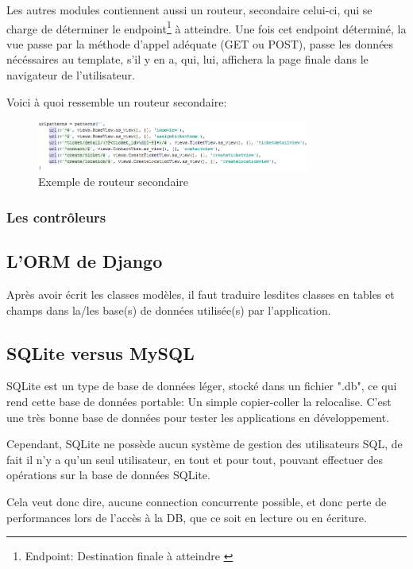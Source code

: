 \documentclass[12pt,table,a4paper]{report}
\begin{document}
Les autres modules contiennent aussi un routeur, secondaire celui-ci, qui se charge de déterminer le endpoint\footnote{Endpoint: Destination finale à atteindre \label{endpointFootnote}} à atteindre. Une fois cet endpoint déterminé, la vue passe par la méthode d'appel adéquate (GET ou POST), passe les données nécéssaires au template, s'il y en a, qui, lui, affichera la page finale dans le navigateur de l'utilisateur.

Voici à quoi ressemble un routeur secondaire:
\begin{figure}
	\centering
		\includegraphics[width=0.8\textwidth,natwidth=737,natheight=136]{images/ticket-routeur-secondaire.png}
	\caption{Exemple de routeur secondaire}
	\label{fig:ticket-routeur-secondaire}
\end{figure}



\subsubsection{Les contrôleurs}

\subsection{L'ORM de Django}
Après avoir écrit les classes modèles, il faut traduire lesdites classes en tables et champs dans la/les base(s) de données utilisée(s) par l'application.

\subsection{SQLite versus MySQL}
SQLite est un type de base de données léger, stocké dans un fichier ".db", ce qui rend cette base de données portable: Un simple copier-coller la relocalise. C'est une très bonne base de données pour tester les applications en développement.

Cependant, SQLite ne possède aucun système de gestion des utilisateurs SQL, de fait il n'y a qu'un seul utilisateur, en tout et pour tout, pouvant effectuer des opérations sur la base de données SQLite.

Cela veut donc dire, aucune connection concurrente possible, et donc perte de performances lors de l'accès à la DB, que ce soit en lecture ou en écriture.
\end{document}
